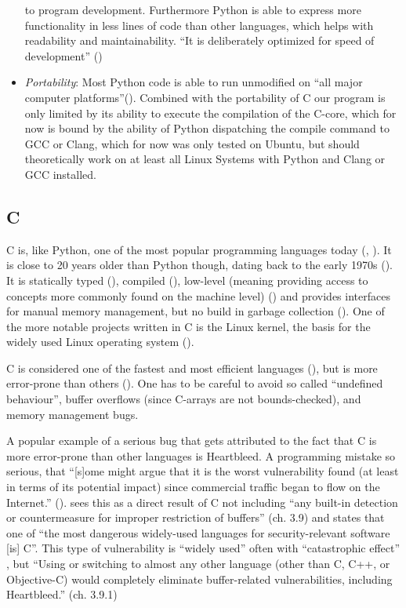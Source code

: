 \begin{itemize}
  to program development. Furthermore Python is able to express more
  functionality in less lines of code than other languages, which helps
  with readability and maintainability. ``It is deliberately optimized
  for speed of development'' (\cite[p. 5]{learningpython})
\item
  \emph{Portability}: Most Python code is able to run unmodified on
  ``all major computer platforms''(\cite[p. 4, 17-18]{learningpython}). Combined
  with the portability of C our program is only limited by its ability
  to execute the compilation of the C-core, which for now is bound by
  the ability of Python dispatching the compile command to GCC or Clang,
  which for now was only tested on Ubuntu, but should theoretically work
  on at least all Linux Systems with Python and Clang or GCC installed.
\end{itemize}

\hypertarget{c}{%
\subsection{C}\label{c}}

C is, like Python, one of the most popular programming languages today
(\cite{instack}, \cite{octgit}). It is close to 20 years older than Python though,
dating back to the early 1970s (\cite[p. 2]{cmodern}). It is statically typed
(\cite[p. 40]{modernc}), compiled (\cite[p. 2]{cmodern}), low-level (meaning providing
access to concepts more commonly found on the machine level) (\cite[p. 4]{cmodern}) and provides interfaces for manual memory management, but no build in
garbage collection (\cite[p. 55]{cpointers}). One of the more notable projects
written in C is the Linux kernel, the basis for the widely used Linux
operating system (\cite{kernel}).

C is considered one of the fastest and most efficient languages
(\cite{benchmarkgame}), but is
more error-prone than others (\cite[p. 5]{modernc}). One has to be careful to avoid
so called ``undefined behaviour'', buffer overflows (since C-arrays are
not bounds-checked), and memory management bugs.

A popular example of a serious bug that gets attributed to the fact that
C is more error-prone than other languages is Heartbleed. A programming
mistake so serious, that ``[s]ome might argue that it is the worst
vulnerability found (at least in terms of its potential impact) since
commercial traffic began to flow on the Internet.'' (\cite{forbes}).
\cite{wheeler} sees this as a
direct result of C not including ``any built-in detection or
countermeasure for improper restriction of buffers'' (ch. 3.9) and
states that one of ``the most dangerous widely-used languages for
security-relevant software [is] C''. This type of vulnerability is
``widely used'' often with ``catastrophic effect'' , but ``Using or
switching to almost any other language (other than C, C++, or
Objective-C) would completely eliminate buffer-related vulnerabilities,
including Heartbleed.'' (ch. 3.9.1)


